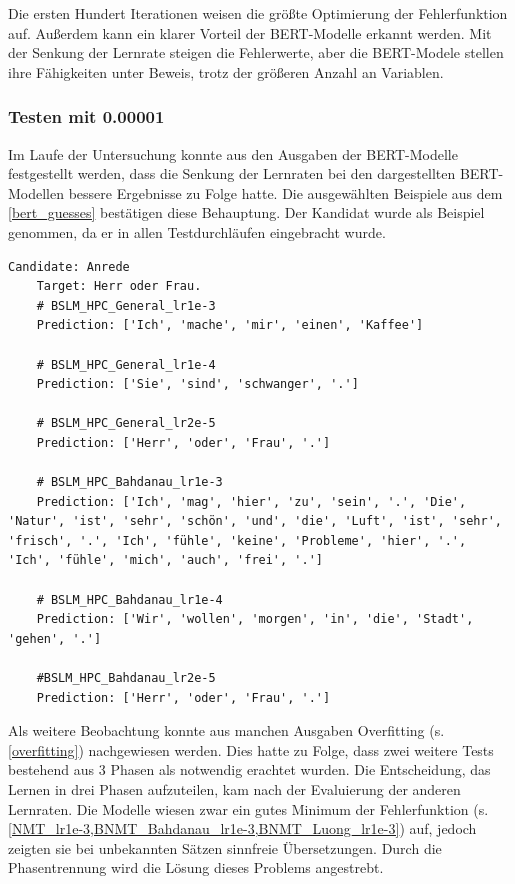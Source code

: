 Die ersten Hundert Iterationen weisen die größte Optimierung der Fehlerfunktion auf. Außerdem kann ein klarer Vorteil der BERT-Modelle erkannt werden. Mit der Senkung der Lernrate steigen die Fehlerwerte, aber die BERT-Modele stellen ihre Fähigkeiten unter Beweis, trotz der größeren Anzahl an Variablen.

\subsubsection{Testen mit 0.00001}

Im Laufe der Untersuchung konnte aus den Ausgaben der BERT-Modelle festgestellt werden, dass die Senkung der Lernraten bei den dargestellten BERT-Modellen bessere Ergebnisse zu Folge hatte. Die ausgewählten Beispiele aus dem \cref{bert_guesses} bestätigen diese Behauptung. Der Kandidat  wurde als Beispiel genommen, da er in allen Testdurchläufen eingebracht wurde.
\begin{lstlisting}[label=bert_guesses,caption={Prognose für ausgewählte Eingaben der BERT-Modelle}]
	Candidate: Anrede
	Target: Herr oder Frau.
	# BSLM_HPC_General_lr1e-3
	Prediction: ['Ich', 'mache', 'mir', 'einen', 'Kaffee']
	
	# BSLM_HPC_General_lr1e-4
	Prediction: ['Sie', 'sind', 'schwanger', '.']
	
	# BSLM_HPC_General_lr2e-5
	Prediction: ['Herr', 'oder', 'Frau', '.']
	
	# BSLM_HPC_Bahdanau_lr1e-3
	Prediction: ['Ich', 'mag', 'hier', 'zu', 'sein', '.', 'Die', 'Natur', 'ist', 'sehr', 'schön', 'und', 'die', 'Luft', 'ist', 'sehr', 'frisch', '.', 'Ich', 'fühle', 'keine', 'Probleme', 'hier', '.', 'Ich', 'fühle', 'mich', 'auch', 'frei', '.']
	
	# BSLM_HPC_Bahdanau_lr1e-4
	Prediction: ['Wir', 'wollen', 'morgen', 'in', 'die', 'Stadt', 'gehen', '.']
	
	#BSLM_HPC_Bahdanau_lr2e-5
	Prediction: ['Herr', 'oder', 'Frau', '.']
\end{lstlisting}

Als weitere Beobachtung konnte aus manchen Ausgaben Overfitting (s. \cref{overfitting}) nachgewiesen werden. Dies hatte zu Folge, dass zwei weitere Tests bestehend aus 3 Phasen als notwendig erachtet wurden. Die Entscheidung, das Lernen in drei Phasen aufzuteilen, kam nach der Evaluierung der anderen Lernraten. Die Modelle wiesen zwar ein gutes Minimum der Fehlerfunktion (s. \cref{NMT_lr1e-3,BNMT_Bahdanau_lr1e-3,BNMT_Luong_lr1e-3}) auf, jedoch zeigten sie bei unbekannten Sätzen sinnfreie Übersetzungen. Durch die Phasentrennung wird die Lösung dieses Problems angestrebt.

